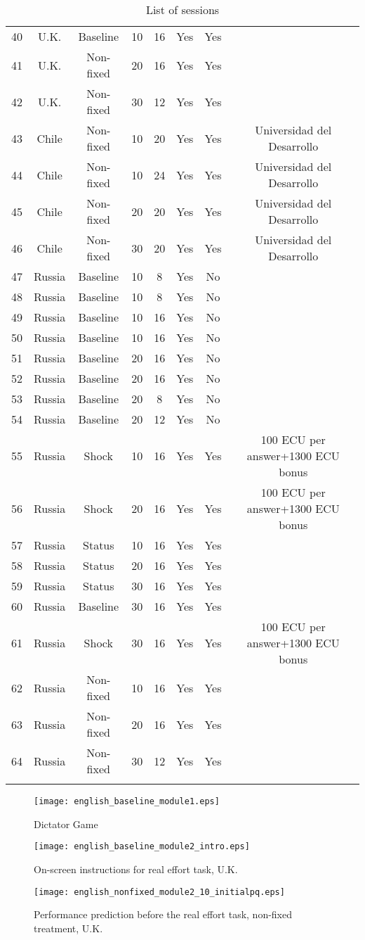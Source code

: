 \documentclass[12pt]{article}
\begin{document}
\begin{table}[ht]
\begin{tabularx}{\textwidth}{lccccccc}
40&U.K.&Baseline&10&16&Yes&Yes& \tabularnewline
41&U.K.&Non-fixed&20&16&Yes&Yes& \tabularnewline
42&U.K.&Non-fixed&30&12&Yes&Yes& \tabularnewline
43&Chile&Non-fixed&10&20&Yes&Yes& Universidad del Desarrollo\tabularnewline
44&Chile&Non-fixed&10&24&Yes&Yes& Universidad del Desarrollo\tabularnewline
45&Chile&Non-fixed&20&20&Yes&Yes& Universidad del Desarrollo\tabularnewline
46&Chile&Non-fixed&30&20&Yes&Yes& Universidad del Desarrollo\tabularnewline
47&Russia&Baseline&10&8&Yes&No& \tabularnewline
48&Russia&Baseline&10&8&Yes&No& \tabularnewline
49&Russia&Baseline&10&16&Yes&No& \tabularnewline
50&Russia&Baseline&10&16&Yes&No& \tabularnewline
51&Russia&Baseline&20&16&Yes&No& \tabularnewline
52&Russia&Baseline&20&16&Yes&No& \tabularnewline
53&Russia&Baseline&20&8&Yes&No& \tabularnewline
54&Russia&Baseline&20&12&Yes&No& \tabularnewline
55&Russia&Shock&10&16&Yes&Yes&100 ECU per answer+1300 ECU bonus \tabularnewline
56&Russia&Shock&20&16&Yes&Yes&100 ECU per answer+1300 ECU bonus \tabularnewline
57&Russia&Status&10&16&Yes&Yes& \tabularnewline
58&Russia&Status&20&16&Yes&Yes& \tabularnewline
59&Russia&Status&30&16&Yes&Yes& \tabularnewline
60&Russia&Baseline&30&16&Yes&Yes& \tabularnewline
61&Russia&Shock&30&16&Yes&Yes&100 ECU per answer+1300 ECU bonus \tabularnewline
62&Russia&Non-fixed&10&16&Yes&Yes& \tabularnewline
63&Russia&Non-fixed&20&16&Yes&Yes& \tabularnewline
64&Russia&Non-fixed&30&12&Yes&Yes& \tabularnewline
\bottomrule \addlinespace[1.5ex]
\end{tabularx}%

\caption{List of sessions}
\label{tab:sesslist}
\end{table}

\clearpage




\begin{figure}[ht]
\centerline{\texttt{[image: english\_baseline\_module1.eps]}}
\caption{Dictator Game}\label{fig:DG}
\end{figure}

\clearpage

\begin{figure}[ht]
\centerline{\texttt{[image: english\_baseline\_module2\_intro.eps]}}
\caption{On-screen instructions for real effort task, U.K.}
\end{figure}

\vspace{1cm}

\begin{figure}[ht]
\centerline{\texttt{[image: english\_nonfixed\_module2\_10\_initialpq.eps]}}
\caption{Performance prediction before the real effort task, non-fixed treatment, U.K.}
\end{figure}
\end{document}
